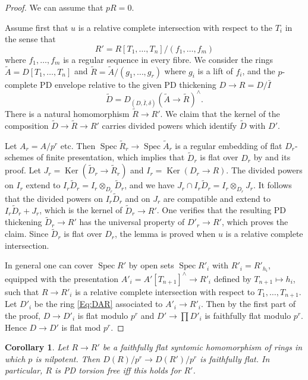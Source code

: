 \documentclass[a4paper,11pt]{article}
\theoremstyle{plain}
\newtheorem{Cor}[Lemma]{Corollary}
\theoremstyle{definition}
\theoremstyle{remark}
\theoremstyle{definition}
\numberwithin{Lemma}{section}
\numberwithin{Subpoint}{Lemma}
\numberwithin{equation}{section}
\DeclareMathOperator{\Ker}{Ker}
\DeclareMathOperator{\Spec}{Spec}
\newcommand{\chang}[1]{{#1}}
\begin{document}
\begin{proof}
We can assume that $pR=0$.

Assume first that $u$ is a relative complete intersection
with respect to the $T_i$ in the sense that
\[
R'=R[T_1,\ldots,T_n]/(f_1,\ldots,f_m)
\] 
where $f_1,\ldots,f_m$ is a regular sequence in every fibre.
We consider the rings $\tilde A=D[T_1,\ldots, T_n]$ 
and $\tilde R=\tilde A/(g_1,\ldots,g_r)$ where $g_i$ is a lift of $f_i$,
and the \chang{$p$-complete} PD envelope relative to the given PD thickening
$D\to R=D/\bar I$
\[
\tilde D=D_{(D,\bar I,\delta)}(\tilde A\to\tilde R)^\wedge.
\]
There is a natural homomorphism $\tilde R\to R'$.
We claim that the kernel of the composition $\tilde D\to \tilde R\to R'$
carries divided powers which identify $\tilde D$ with $D'$. 

Let $A_r=A/p^r$ etc.
Then $\Spec\tilde R_r\to\Spec\tilde A_r$ 
is a regular embedding of flat $D_r$-schemes of finite \chang{presentation},
which implies that $\tilde D_r$ is flat over $D_r$ by \cite[Lemma 2.3.3]{BBM} and its proof.
Let $J_r=\Ker(\tilde D_r\to\tilde R_r)$ and $I_r=\Ker(D_r\to R)$.
The divided powers on $I_r$ extend to 
$I_r\tilde D_r=I_r\otimes_{D_r}\tilde D_r$,
and we have $J_r\cap I_r\tilde D_r=I_r\otimes_{D_r}J_r$.
It follows that the divided powers on $I_r\tilde D_r$
and on $J_r$ are compatible and extend to $I_r\tilde D_r+J_r$,
which is the kernel of $\tilde D_r\to R'$.
One verifies that the resulting PD thickening $\tilde D_r\to R'$
has the universal property of $D'_r\to R'$, which proves the claim.
Since $\tilde D_r$ is flat over $D_r$, the lemma is proved when
$u$ is a relative complete intersection.

In general one can cover $\Spec R'$ 
by open sets $\Spec R'_i$ with $R'_i=R'_{h_i}$,
equipped with the presentation $A'_i=A'[T_{n+1}]^\wedge\to R'_i$
defined by $T_{n+1}\mapsto h_i$,
such that $R\to R'_i$ is a relative complete intersection with respect to
$T_1,\ldots,T_{n+1}$. 
Let $D'_i$ be the ring \eqref{Eq:DAR} associated to $A'_i\to R'_i$.
Then by the first part of the proof, 
$D\to D'_i$ is flat modulo $p^r$ 
and $D'\to\prod D'_i$ is faithfully flat modulo $p^r$. 
Hence $D\to D'$ is flat mod $p^r$.
\end{proof}

\begin{Cor}
\label{Co:DAR-lci-tf}
Let $R\to R'$ be a faithfully flat syntomic homomorphism 
of rings in which $p$ is nilpotent.
Then $D(R)/p^r\to D(R')/p^r$ is faithfully flat. 
In particular, $R$ is PD torsion free iff this holds for $R'$. 
\end{Cor}
\end{document}
